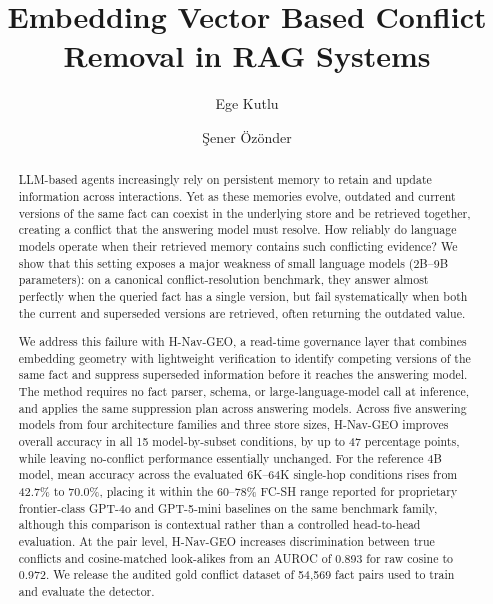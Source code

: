 \documentclass[journal=jcisd8,manuscript=article]{achemso}
\title{Embedding Vector Based Conflict Removal in RAG Systems}
\author{Ege Kutlu}
\affiliation{Institute for Data Science \& Artificial Intelligence, Bo\u{g}azi\c{c}i University, \.{I}stanbul, T\"{u}rkiye}
\author{\c{S}ener \"Oz\"onder}
\affiliation{Institute for Data Science \& Artificial Intelligence, Bo\u{g}azi\c{c}i University, \.{I}stanbul, T\"{u}rkiye}
\begin{document}
\captionsetup[figure]{font=footnotesize}


\maketitle

\begin{abstract}
LLM-based agents increasingly rely on persistent memory to retain and update information across interactions. Yet as these memories evolve, outdated and current versions of the same fact can coexist in the underlying store and be retrieved together, creating a conflict that the answering model must resolve. How reliably do language models operate when their retrieved memory contains such conflicting evidence? We show that this setting exposes a major weakness of small language models (2B--9B parameters): on a canonical conflict-resolution benchmark, they answer almost perfectly when the queried fact has a single version, but fail systematically when both the current and superseded versions are retrieved, often returning the outdated value.

We address this failure with H-Nav-GEO, a read-time governance layer that combines embedding geometry with lightweight verification to identify competing versions of the same fact and suppress superseded information before it reaches the answering model. The method requires no fact parser, schema, or large-language-model call at inference, and applies the same suppression plan across answering models. Across five answering models from four architecture families and three store sizes, H-Nav-GEO improves overall accuracy in all 15 model-by-subset conditions, by up to 47 percentage points, while leaving no-conflict performance essentially unchanged. For the reference 4B model, mean accuracy across the evaluated 6K--64K single-hop conditions rises from 42.7\% to 70.0\%, placing it within the 60--78\% FC-SH range reported for proprietary frontier-class GPT-4o and GPT-5-mini baselines on the same benchmark family, although this comparison is contextual rather than a controlled head-to-head evaluation. At the pair level, H-Nav-GEO increases discrimination between true conflicts and cosine-matched look-alikes from an AUROC of 0.893 for raw cosine to 0.972. We release the audited gold conflict dataset of 54,569 fact pairs used to train and evaluate the detector.

\end{abstract}

\newcommand{\code}[1]{\texttt{\detokenize{#1}}}
\end{document}
